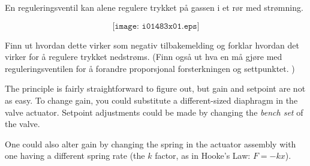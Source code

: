 


En reguleringsventil kan alene regulere trykket på gassen i et rør med strømning. 

$$\texttt{[image: i01483x01.eps]}$$


Finn ut hvordan dette virker som negativ tilbakemelding og forklar hvordan det virker for å regulere trykket nedstrøms. (Finn også ut hva en må gjøre med reguleringsventilen for å forandre proporsjonal forsterkningen og settpunktet. )







The principle is fairly straightforward to figure out, but gain and setpoint are not as easy.  To change gain, you could substitute a different-sized diaphragm in the valve actuator.  Setpoint adjustments could be made by changing the {\it bench set} of the valve.







One could also alter gain by changing the spring in the actuator assembly with one having a different spring rate (the $k$ factor, as in Hooke's Law: $F = -kx$).





